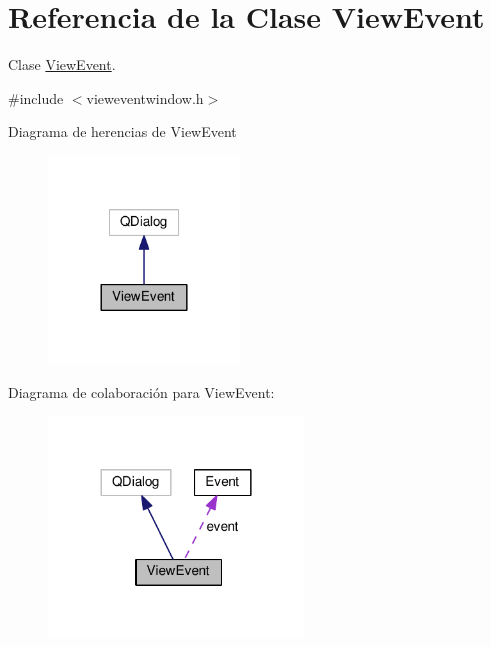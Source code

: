 \hypertarget{class_view_event}{}\section{Referencia de la Clase View\+Event}
\label{class_view_event}


Clase \hyperlink{class_view_event}{View\+Event}.  




{\ttfamily \#include $<$vieweventwindow.\+h$>$}



Diagrama de herencias de View\+Event\nopagebreak
\begin{figure}[H]
\begin{center}
\leavevmode
\includegraphics[width=144pt]{class_view_event__inherit__graph}
\end{center}
\end{figure}


Diagrama de colaboración para View\+Event\+:\nopagebreak
\begin{figure}[H]
\begin{center}
\leavevmode
\includegraphics[width=192pt]{class_view_event__coll__graph}
\end{center}
\end{figure}
